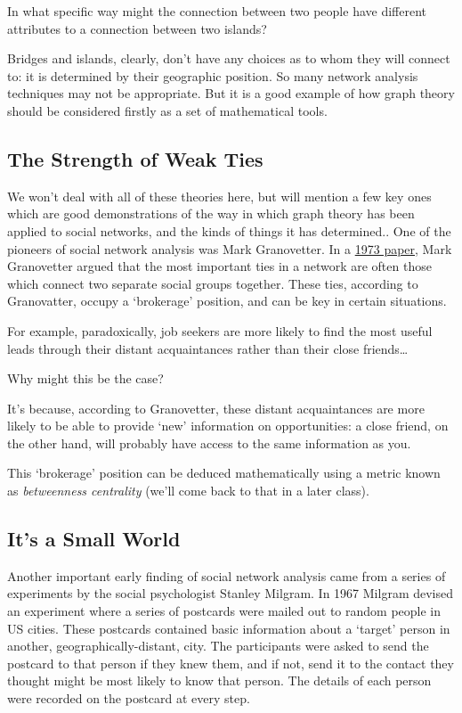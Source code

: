 \documentclass[
]{book}
\begin{document}
In what specific way might the connection between two people have different attributes to a connection between two islands?

Bridges and islands, clearly, don't have any choices as to whom they will connect to: it is determined by their geographic position. So many network analysis techniques may not be appropriate. But it is a good example of how graph theory should be considered firstly as a set of mathematical tools.

\hypertarget{the-strength-of-weak-ties}{%
\subsection{The Strength of Weak Ties}\label{the-strength-of-weak-ties}}

We won't deal with all of these theories here, but will mention a few key ones which are good demonstrations of the way in which graph theory has been applied to social networks, and the kinds of things it has determined.. One of the pioneers of social network analysis was Mark Granovetter. In a \href{https://www.jstor.org/stable/2776392}{1973 paper}, Mark Granovetter argued that the most important ties in a network are often those which connect two separate social groups together. These ties, according to Granovatter, occupy a `brokerage' position, and can be key in certain situations.

For example, paradoxically, job seekers are more likely to find the most useful leads through their distant acquaintances rather than their close friends\ldots{}

Why might this be the case?

It's because, according to Granovetter, these distant acquaintances are more likely to be able to provide `new' information on opportunities: a close friend, on the other hand, will probably have access to the same information as you.

This `brokerage' position can be deduced mathematically using a metric known as \emph{betweenness centrality} (we'll come back to that in a later class).

\hypertarget{its-a-small-world}{%
\subsection{It's a Small World}\label{its-a-small-world}}

Another important early finding of social network analysis came from a series of experiments by the social psychologist Stanley Milgram. In 1967 Milgram devised an experiment where a series of postcards were mailed out to random people in US cities. These postcards contained basic information about a `target' person in another, geographically-distant, city. The participants were asked to send the postcard to that person if they knew them, and if not, send it to the contact they thought might be most likely to know that person. The details of each person were recorded on the postcard at every step.
\end{document}
